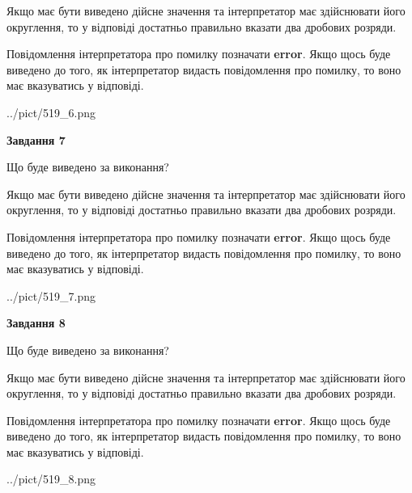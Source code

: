\documentclass[12pt, ukrainian]{article}
\begin{document}
{\begin {Large}
Якщо має бути виведено дійсне значення та інтерпретатор має здійснювати його округлення, 
то у відповіді достатньо правильно вказати два дробових розряди.

Повідомлення інтерпретатора про помилку позначати \textbf{error}.
Якщо щось буде виведено до того, як інтерпретатор видасть повідомлення про помилку, 
то воно має вказуватись у відповіді. \par

\begin{center}
	{../pict/519_6.png}
\end{center}
\newpage

{\begin {center}\textbf{Завдання 7}\end {center}}\par
Що буде виведено за виконання? \par

Якщо має бути виведено дійсне значення та інтерпретатор має здійснювати його округлення, 
то у відповіді достатньо правильно вказати два дробових розряди.

Повідомлення інтерпретатора про помилку позначати \textbf{error}.
Якщо щось буде виведено до того, як інтерпретатор видасть повідомлення про помилку, 
то воно має вказуватись у відповіді. \par

\begin{center}
	{../pict/519_7.png}
\end{center}
\newpage

{\begin {center}\textbf{Завдання 8}\end {center}}\par
Що буде виведено за виконання? \par

Якщо має бути виведено дійсне значення та інтерпретатор має здійснювати його округлення, 
то у відповіді достатньо правильно вказати два дробових розряди.

Повідомлення інтерпретатора про помилку позначати \textbf{error}.
Якщо щось буде виведено до того, як інтерпретатор видасть повідомлення про помилку, 
то воно має вказуватись у відповіді. \par

\begin{center}
	{../pict/519_8.png}
\end{center}
\newpage


\end{Large}}
\end{document}
